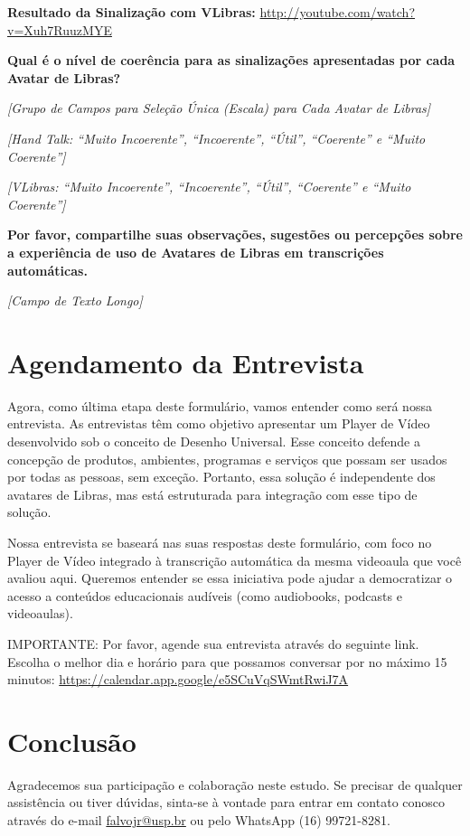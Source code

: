 \noindent
\textbf{Resultado da Sinalização com VLibras:} \url{http://youtube.com/watch?v=Xuh7RuuzMYE}

\noindent
\textbf{Qual é o nível de coerência para as sinalizações apresentadas por cada Avatar de Libras?}

\noindent
\textit{[Grupo de Campos para Seleção Única (Escala) para Cada Avatar de Libras]}

\noindent
\textit{[Hand Talk: ``Muito Incoerente'', ``Incoerente'', ``Útil'', ``Coerente'' e ``Muito Coerente'']}

\noindent
\textit{[VLibras: ``Muito Incoerente'', ``Incoerente'', ``Útil'', ``Coerente'' e ``Muito Coerente'']}

\noindent
\textbf{Por favor, compartilhe suas observações, sugestões ou percepções sobre
a experiência de uso de Avatares de Libras em transcrições automáticas.}

\noindent
\textit{[Campo de Texto Longo]}

\section{Agendamento da Entrevista}

\noindent
Agora, como última etapa deste formulário, vamos entender como será nossa 
entrevista. As entrevistas têm como objetivo apresentar um Player de Vídeo 
desenvolvido sob o conceito de Desenho Universal. Esse conceito defende a concepção 
de produtos, ambientes, programas e serviços que possam ser usados por todas as 
pessoas, sem exceção. Portanto, essa solução é independente dos avatares de Libras, 
mas está estruturada para integração com esse tipo de solução.

\noindent
Nossa entrevista se baseará nas suas respostas deste formulário, com foco no Player de 
Vídeo integrado à transcrição automática da mesma videoaula que você avaliou aqui. 
Queremos entender se essa iniciativa pode ajudar a democratizar o acesso a conteúdos 
educacionais audíveis (como audiobooks, podcasts e videoaulas).

\noindent
IMPORTANTE: Por favor, agende sua entrevista através do seguinte link. Escolha o melhor 
dia e horário para que possamos conversar por no máximo 15 minutos: 
\url{https://calendar.app.google/e5SCuVqSWmtRwiJ7A}

\section{Conclusão}

\noindent
Agradecemos sua participação e colaboração neste estudo. Se precisar de qualquer 
assistência ou tiver dúvidas, sinta-se à vontade para entrar em contato conosco através do e-mail \href{mailto:falvojr@usp.br}{falvojr@usp.br} ou pelo WhatsApp (16) 99721-8281. 